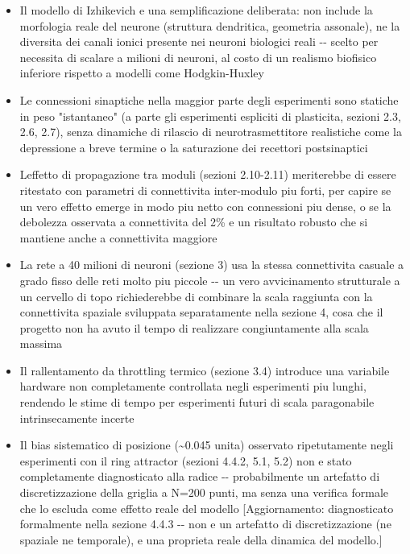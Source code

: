 \documentclass[
  italian,
]{article}
\begin{document}
\begin{itemize}
\item
  Il modello di Izhikevich e\textquotesingle{} una semplificazione deliberata: non include la morfologia reale del neurone (struttura dendritica, geometria assonale), ne\textquotesingle{} la diversita\textquotesingle{} dei canali ionici presente nei neuroni biologici reali -\/- scelto per necessita\textquotesingle{} di scalare a milioni di neuroni, al costo di un realismo biofisico inferiore rispetto a modelli come Hodgkin-Huxley
\item
  Le connessioni sinaptiche nella maggior parte degli esperimenti sono statiche in peso "istantaneo" (a parte gli esperimenti espliciti di plasticita\textquotesingle, sezioni 2.3, 2.6, 2.7), senza dinamiche di rilascio di neurotrasmettitore realistiche come la depressione a breve termine o la saturazione dei recettori postsinaptici
\item
  L\textquotesingle effetto di propagazione tra moduli (sezioni 2.10-2.11) meriterebbe di essere ritestato con parametri di connettivita\textquotesingle{} inter-modulo piu\textquotesingle{} forti, per capire se un vero effetto emerge in modo piu\textquotesingle{} netto con connessioni piu\textquotesingle{} dense, o se la debolezza osservata a connettivita\textquotesingle{} del 2\% e\textquotesingle{} un risultato robusto che si mantiene anche a connettivita\textquotesingle{} maggiore
\item
  La rete a 40 milioni di neuroni (sezione 3) usa la stessa connettivita\textquotesingle{} casuale a grado fisso delle reti molto piu\textquotesingle{} piccole -\/- un vero avvicinamento strutturale a un cervello di topo richiederebbe di combinare la scala raggiunta con la connettivita\textquotesingle{} spaziale sviluppata separatamente nella sezione 4, cosa che il progetto non ha avuto il tempo di realizzare congiuntamente alla scala massima
\item
  Il rallentamento da throttling termico (sezione 3.4) introduce una variabile hardware non completamente controllata negli esperimenti piu\textquotesingle{} lunghi, rendendo le stime di tempo per esperimenti futuri di scala paragonabile intrinsecamente incerte
\item
  Il bias sistematico di posizione (\textasciitilde0.045 unita\textquotesingle) osservato ripetutamente negli esperimenti con il ring attractor (sezioni 4.4.2, 5.1, 5.2) non e\textquotesingle{} stato completamente diagnosticato alla radice -\/- probabilmente un artefatto di discretizzazione della griglia a N=200 punti, ma senza una verifica formale che lo escluda come effetto reale del modello {[}Aggiornamento: diagnosticato formalmente nella sezione 4.4.3 -\/- non e\textquotesingle{} un artefatto di discretizzazione (ne\textquotesingle{} spaziale ne\textquotesingle{} temporale), e\textquotesingle{} una proprieta\textquotesingle{} reale della dinamica del modello.{]}

\end{itemize}
\end{document}
